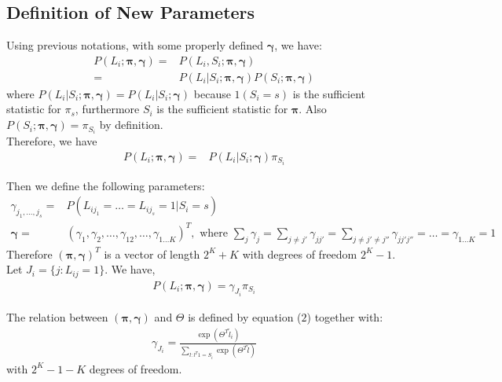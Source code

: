 \documentclass[11 pt, a4paper]{article}  %
\begin{document}
\subsection{Definition of New Parameters}
Using previous notations,  with some properly defined $\boldsymbol\gamma$, we have:
\begin{align*}
P(L_i;\boldsymbol\pi, \boldsymbol\gamma) = & P(L_i,S_i;\boldsymbol\pi, \boldsymbol\gamma) \\
= & P(L_i|S_i;\boldsymbol\pi, \boldsymbol\gamma) P(S_i;\boldsymbol\pi, \boldsymbol\gamma)
\end{align*}
where $P(L_i|S_i;\boldsymbol\pi, \boldsymbol\gamma) = P(L_i|S_i;\boldsymbol\gamma)$ because $1(S_i=s)$ is the sufficient statistic for $\pi_s$, furthermore $S_i$ is the sufficient statistic for $\boldsymbol \pi$. Also $P(S_i;\boldsymbol\pi, \boldsymbol\gamma) = \pi_{S_i}$ by definition. \\

Therefore, we have
\begin{align*}
P(L_i;\boldsymbol\pi, \boldsymbol\gamma) = &P(L_i|S_i;\boldsymbol\gamma)\pi_{S_i}
\end{align*}

Then we define the following parameters:
\begin{align}
\gamma_{j_1,\ldots,j_s} = & P(L_{ij_1}=\ldots=L_{ij_s}=1|S_i=s)\\
\boldsymbol\gamma = & (\gamma_1,\gamma_2,\ldots,\gamma_{12},\ldots,\gamma_{1\ldots K})^T , \text{ where }
\sum_{j} \gamma_j = \sum_{j\neq j'} \gamma_{jj'} = \sum_{j\neq j'\neq j''} \gamma_{jj'j''} = \ldots = \gamma_{1\ldots K} = 1 \nonumber
\end{align}
Therefore $(\boldsymbol\pi, \boldsymbol\gamma)^T$ is a vector of length $2^K+K$ with degrees of freedom $2^K-1$.\\

Let $J_i = \{j: L_{ij}=1\}$. We have,
\begin{align}
P(L_i;\boldsymbol\pi, \boldsymbol\gamma) = \gamma_{J_i} \pi_{S_i}
\end{align}

The relation between $(\boldsymbol\pi, \boldsymbol\gamma)$ and $\Theta$ is defined by equation ($2$) together with:
\begin{align}
\gamma_{J_i} = \frac{\exp(\Theta^T \tilde{l}_i)}{\sum_{l:l^T1=S_i}\exp(\Theta^T\tilde{l})}
\end{align}
with $2^K-1-K$ degrees of freedom.\\
\end{document}
